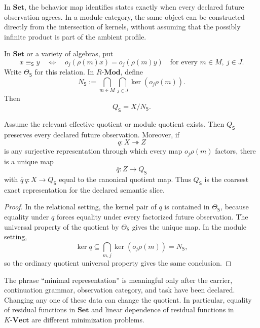 In \(\mathbf{Set}\), the behavior map identifies states exactly when every declared future observation agrees.  In a module category, the same object can be constructed directly from the intersection of kernels, without assuming that the possibly infinite product is part of the ambient profile.

\begin{definition}
\label{def:block17-behavioral-kernel}
In \(\mathbf{Set}\) or a variety of algebras, put
\[
 x\equiv_{\mathsf S}y
 \quad\Longleftrightarrow\quad
 o_j(\rho(m)x)=o_j(\rho(m)y)
 \quad\text{for every }m\in M,\ j\in J.
\]
Write \(\Theta_{\mathsf S}\) for this relation.  In \(R\text{-}\mathbf{Mod}\), define
\[
 N_{\mathsf S}
 :=
 \bigcap_{m\in M}\bigcap_{j\in J}
 \ker(o_j\rho(m)).
\]
Then
\[
 Q_{\mathsf S}=X/N_{\mathsf S}.
\]
\end{definition}

\begin{theorem}
\label{thm:block17-universal-behavioral-coimage}
Assume the relevant effective quotient or module quotient exists.  Then \(Q_{\mathsf S}\) preserves every declared future observation.  Moreover, if
\[
 q:X\twoheadrightarrow Z
\]
is any surjective representation through which every map \(o_j\rho(m)\) factors, there is a unique map
\[
 \overline q:Z\longrightarrow Q_{\mathsf S}
\]
with \(\overline q\,q:X\to Q_{\mathsf S}\) equal to the canonical quotient map.  Thus \(Q_{\mathsf S}\) is the coarsest exact representation for the declared semantic slice.
\end{theorem}

\begin{proof}
In the relational setting, the kernel pair of \(q\) is contained in \(\Theta_{\mathsf S}\), because equality under \(q\) forces equality under every factorized future observation.  The universal property of the quotient by \(\Theta_{\mathsf S}\) gives the unique map.  In the module setting,
\[
 \ker q\subseteq
 \bigcap_{m,j}\ker(o_j\rho(m))=N_{\mathsf S},
\]
so the ordinary quotient universal property gives the same conclusion.
\end{proof}

\begin{boundary}
\label{bnd:block17-no-absolute-minimum}
The phrase ``minimal representation'' is meaningful only after the carrier, continuation grammar, observation category, and task have been declared.  Changing any one of these data can change the quotient.  In particular, equality of residual functions in \(\mathbf{Set}\) and linear dependence of residual functions in \(K\text{-}\mathbf{Vect}\) are different minimization problems.
\end{boundary}

